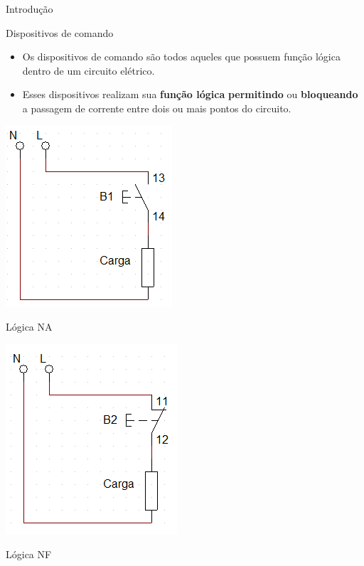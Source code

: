 \begin{frame}{Introdução}
\begin{block}{Dispositivos de comando}
\begin{itemize}
    \item Os dispositivos de comando são todos aqueles que possuem função lógica dentro de um circuito elétrico. 
    \item Esses dispositivos realizam sua \textbf{função lógica }\textbf{permitindo }ou \textbf{bloqueando} a passagem de corrente entre dois ou mais pontos do circuito.
\end{itemize}
\end{block}

\begin{minipage}{0.45\linewidth}
	\centering
	\includegraphics[width=0.6\linewidth]{Figuras/Ch06/fig2.jpg}
	
	Lógica NA
\end{minipage}
\hfill
\begin{minipage}{0.45\linewidth}
	\centering
	\includegraphics[width=0.6\linewidth]{Figuras/Ch06/fig3.jpg}
	
	Lógica NF
\end{minipage}
\end{frame}

